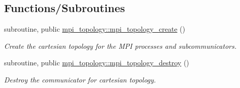 \subsection*{Functions/\+Subroutines}
\begin{DoxyCompactItemize}
\item 
\mbox{\label{namespacempi__topology_ae299dc83f2e6767402df3dfacfad4e44}} 
subroutine, public \hyperlink{namespacempi__topology_ae299dc83f2e6767402df3dfacfad4e44}{mpi\+\_\+topology\+::mpi\+\_\+topology\+\_\+create} ()
\begin{DoxyCompactList}\small\item\em Create the cartesian topology for the M\+PI processes and subcommunicators. \end{DoxyCompactList}\item 
\mbox{\label{namespacempi__topology_a27582d0f86406910fa43ad925ac38801}} 
subroutine, public \hyperlink{namespacempi__topology_a27582d0f86406910fa43ad925ac38801}{mpi\+\_\+topology\+::mpi\+\_\+topology\+\_\+destroy} ()
\begin{DoxyCompactList}\small\item\em Destroy the communicator for cartesian topology. \end{DoxyCompactList}\end{DoxyCompactItemize}
